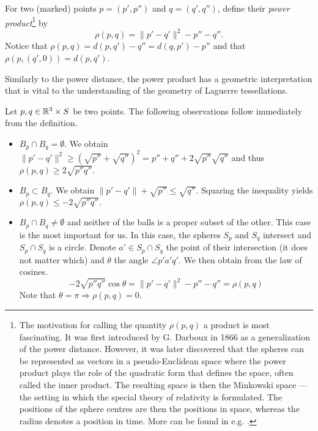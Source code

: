 \begin{definition}
	For two (marked) points $p=(p',p'')$ and $q=(q',q'')$, define their \textit{power product}\footnote{ The motivation for calling the quantity $\rho(p,q)$ a product is most fascinating. It was first introduced by G. Darboux in 1866 as a generalization of the power distance. However, it was later discovered that the spheres can be represented as vectors in a pseudo-Euclidean space where the power product plays the role of the quadratic form that defines the space, often called the inner product. The resulting space is then the Minkowski space --- the setting in which the special theory of relativity is formulated. The positions of the sphere centres are then the positions in space, whereas the radius denotes a position in time. More can be found in e.g. \cite{Kocik2007}.} by 
$$\rho(p,q) = \|p'-q'\|^2 - p'' - q''.$$
Notice that $\rho(p,q) = d(p,q') - q'' = d(q,p') - p''$ and that $\rho(p,(q',0)) = d(p,q')$.
\end{definition}

Similarly to the power distance, the power product has a geometric interpretation that is vital to the understanding of the geometry of Laguerre tessellations.

\begin{remark}
Let $p,q \in {\mathbb R^3}\times S$ be two points. The following observations follow immediately from the definition. 
\begin{itemize}
	\item $B_p\cap B_q = \emptyset$. We obtain $\|p'-q'\|^2 \geq (\sqrt{p''} + \sqrt{q''})^2 = p'' + q'' + 2\sqrt{p''}\sqrt{q''}$ and thus $\rho(p,q) \geq 2\sqrt{p'' q''}.$ 
	\item $B_p \subset B_q$. We obtain $\|p'-q'\| + \sqrt{p''} \leq \sqrt{q''} $. Squaring the inequality yields $\rho(p,q) \leq -2\sqrt{p'' q''}.$ 
	\item $B_p \cap B_q \neq \emptyset$ and neither of the balls is a proper subset of the other. This case is the most important for us. In this case, the spheres $S_p$ and $S_q$ intersect and $S_p\cap S_q$ is a circle. Denote $a' \in S_p \cap S_q$ the point of their intersection (it does not matter which) and $\theta$ the angle $\angle p'a'q'$. We then obtain from the law of cosines. 
	$$- 2\sqrt{p'' q''}\cos \theta = \|p'-q'\|^2 - p'' - q'' = \rho(p,q)$$
	Note that $\theta = \pi \Rightarrow \rho(p,q)=0$.
\end{itemize}
\end{remark}

